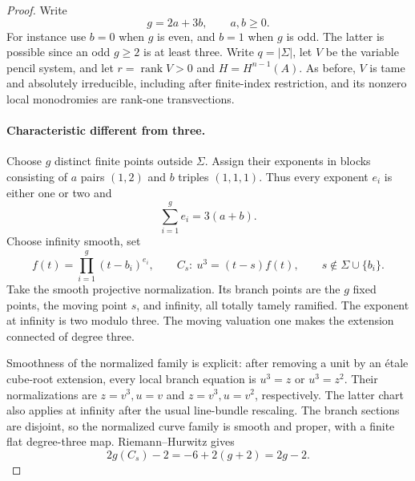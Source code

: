 \begin{proof}
Write
\[
                    g=2a+3b,\qquad a,b\ge0.
\]
For instance use $b=0$ when $g$ is even, and $b=1$ when
$g$ is odd. The latter is possible since an odd
$g\ge2$ is at least three. Write $q=|\Sigma|$,
let $V$ be the variable pencil system, and let
$r=\operatorname{rank}V>0$ and $H=H^{n-1}(A)$.
As before, $V$ is tame and absolutely irreducible,
including after finite-index restriction, and its
nonzero local monodromies are rank-one transvections.

\paragraph{Characteristic different from three.}
Choose $g$ distinct finite points outside $\Sigma$.
Assign their exponents in blocks consisting of
$a$ pairs $(1,2)$ and $b$ triples $(1,1,1)$.
Thus every exponent $e_i$ is either one or two and
\[
          \sum_{i=1}^{g}e_i=3(a+b).
\]
Choose infinity smooth, set
\[
         f(t)=\prod_{i=1}^{g}(t-b_i)^{e_i},
 \qquad C_s:\ u^3=(t-s)f(t),
 \qquad s\notin\Sigma\cup\{b_i\}.
                                                               \tag{H9.127}
\]
Take the smooth projective normalization. Its branch
points are the $g$ fixed points, the moving point
$s$, and infinity, all totally tamely ramified.
The exponent at infinity is two modulo three.
The moving valuation one makes the extension
connected of degree three.

Smoothness of the normalized family is explicit:
after removing a unit by an \'etale cube-root
extension, every local branch equation is
$u^3=z$ or $u^3=z^2$. Their normalizations are
$z=v^3,u=v$ and $z=v^3,u=v^2$, respectively.
The latter chart also applies at infinity after
the usual line-bundle rescaling. The branch
sections are disjoint, so the normalized curve
family is smooth and proper, with a finite flat
degree-three map. Riemann--Hurwitz gives
\[
             2g(C_s)-2=-6+2(g+2)=2g-2.
\]


\end{proof}
